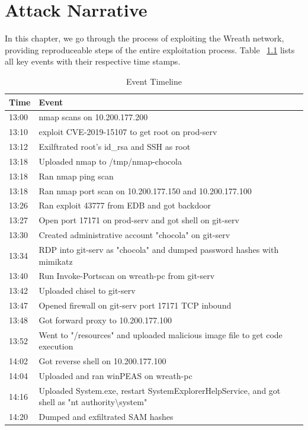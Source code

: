 \chapter{Attack Narrative}
In this chapter, we go through the process of exploiting the Wreath network, providing reproduceable steps of the entire exploitation process. Table ~\ref{tbl:event timeline} lists all key events with their respective time stamps.

\begin{table}[h]
  \centering
  \begin{tabular}{|l|p{15cm}|}
    \hline
    Time & Event \\
    \hline
    13:00 & nmap scans on 10.200.177.200 \\
    \hline
    13:10 & exploit CVE-2019-15107 to get root on prod-serv \\
    \hline
    13:12 & Exilftrated root's id\_rsa and SSH as root \\
    \hline
    13:18 & Uploaded nmap to /tmp/nmap-chocola \\
    \hline
    13:18 & Ran nmap ping scan \\
    \hline
    13:18 & Ran nmap port scan on 10.200.177.150 and 10.200.177.100 \\
    \hline
    13:26 & Ran exploit 43777 from EDB and got backdoor \\
    \hline
    13:27 & Open port 17171 on prod-serv and got shell on git-serv \\
    \hline
    13:30 & Created administrative account "chocola" on git-serv \\
    \hline
    13:34 & RDP into git-serv as "chocola" and dumped password hashes with mimikatz \\
    \hline
    13:40 & Run Invoke-Portscan on wreath-pc from git-serv \\
    \hline
    13:42 & Uploaded chisel to git-serv \\
    \hline
    13:47 & Opened firewall on git-serv port 17171 TCP inbound \\
    \hline
    13:48 & Got forward proxy to 10.200.177.100 \\
    \hline
    13:52 & Went to "/resources" and uploaded malicious image file to get code execution \\
    \hline
    14:02 & Got reverse shell on 10.200.177.100 \\
    \hline
    14:04 & Uploaded and ran winPEAS on wreath-pc \\
    \hline
    14:16 & Uploaded System.exe, restart SystemExplorerHelpService, and got shell as "nt authority\textbackslash system" \\
    \hline
    14:20 & Dumped and exfiltrated SAM hashes \\
    \hline
  \end{tabular}
\caption{Event Timeline}
\label{tbl:event timeline}
\end{table}

